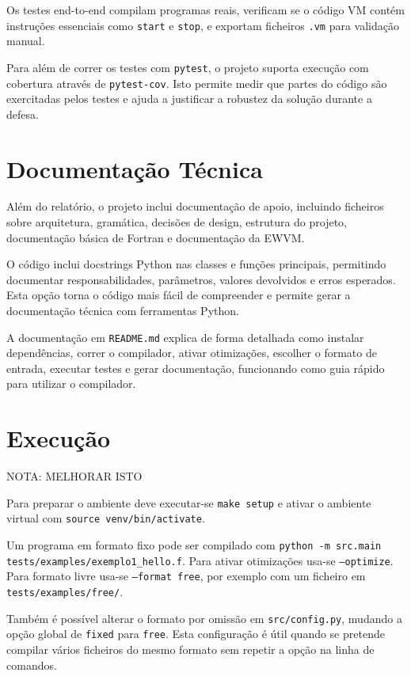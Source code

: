 \documentclass[11pt,a4paper]{report}
\begin{document}
Os testes end-to-end compilam programas reais, verificam se o código VM contém instruções essenciais como \texttt{start} e \texttt{stop}, e exportam ficheiros \texttt{.vm} para validação manual.

Para além de correr os testes com \texttt{pytest}, o projeto suporta execução com cobertura através de \texttt{pytest-cov}. Isto permite medir que partes do código são exercitadas pelos testes e ajuda a justificar a robustez da solução durante a defesa.

\section{Documentação Técnica}

Além do relatório, o projeto inclui documentação de apoio, incluindo ficheiros sobre arquitetura, gramática, decisões de design, estrutura do projeto, documentação básica de Fortran e documentação da EWVM.

O código inclui docstrings Python nas classes e funções principais, permitindo documentar responsabilidades, parâmetros, valores devolvidos e erros esperados. Esta opção torna o código mais fácil de compreender e permite gerar a documentação técnica com ferramentas Python.

A documentação em \texttt{README.md} explica de forma detalhada como instalar dependências, correr o compilador, ativar otimizações, escolher o formato de entrada, executar testes e gerar documentação, funcionando como guia rápido para utilizar o compilador.

\section{Execução}

NOTA: MELHORAR ISTO 

Para preparar o ambiente deve executar-se \texttt{make setup} e ativar o ambiente virtual com \texttt{source venv/bin/activate}. 

Um programa em formato fixo pode ser compilado com \texttt{python -m src.main tests/examples/exemplo1\_hello.f}. Para ativar otimizações usa-se \texttt{--optimize}. Para formato livre usa-se \texttt{--format free}, por exemplo com um ficheiro em \texttt{tests/examples/free/}.

Também é possível alterar o formato por omissão em \texttt{src/config.py}, mudando a opção global de \texttt{fixed} para \texttt{free}. Esta configuração é útil quando se pretende compilar vários ficheiros do mesmo formato sem repetir a opção na linha de comandos.
\end{document}
